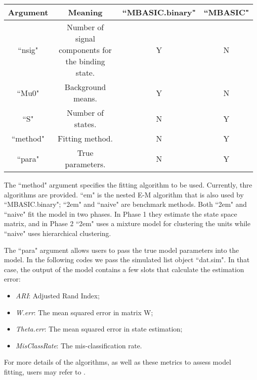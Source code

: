 \documentclass[a4paper,10pt]{article}
\begin{document}
\begin{center}
\begin{tabular}{cccc}
  \hline
  Argument & Meaning & ``MBASIC.binary" & ``MBASIC" \\
  \hline
  ``nsig" & Number of signal components for the binding state. & Y & N \\
  ``Mu0" & Background means. & Y & N \\
  ``S" & Number of states. & N & Y \\
  ``method" & Fitting method. & N & Y\\
  ``para" & True parameters. & N & Y \\
  \hline
\end{tabular}
\end{center}
  
The ``method" argument specifies the fitting algorithm to be used. Currently, thre algorithms are provided. ``em" is the nested E-M algorithm that is also used by ``MBASIC.binary"; ``2em" and ``naive" are benchmark methods. Both ``2em" and ``naive" fit the model in two phases. In Phase 1 they estimate the state space matrix, and in Phase 2 ``2em" uses a mixture model for clustering the units while ``naive" uses hierarchical clustering.

The ``para" argument allows users to pass the true model parameters into the model. In the following codes we pass the simulated list object ``dat.sim". In that case, the output of the model contains a few slots that calculate the estimation error:

\begin{itemize}
\item \textit{ARI}: Adjusted Rand Index;
\item \textit{W.err}: The mean squared error in matrix W;
\item \textit{Theta.err}: The mean squared error in state estimation;
\item \textit{MisClassRate}: The mis-classification rate.
\end{itemize}
  
For more details of the algorithms, as well as these metrics to assess model fitting, users may refer to \cite{zuo14}.

\begin{Schunk}
\end{Schunk}
\end{document}
